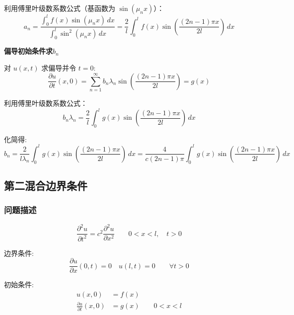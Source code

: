 \documentclass[12pt,a4paper]{article}
\numberwithin{subsection}{section}   %
\numberwithin{subsubsection}{subsection}
\theoremstyle{plain}
\theoremstyle{definition}
\theoremstyle{remark}
\theoremstyle{remark}
\begin{document}
	利用傅里叶级数系数公式（基函数为 $\sin(\mu_n x)$）：
	\begin{equation}
		a_n = \frac{\int_0^l f(x) \sin(\mu_n x) \, dx}{\int_0^l \sin^2(\mu_n x) \, dx} = \frac{2}{l} \int_0^l f(x) \sin\left(\frac{(2n-1)\pi x}{2l}\right) \, dx
	\end{equation}
	
	\noindent
	\textbf{偏导初始条件求$b_n$}
	
	对 $u(x,t)$ 求偏导并令 $t=0$:
	\begin{equation}
		\frac{\partial u}{\partial t}(x, 0) = \sum_{n=1}^{\infty} b_n \lambda_n \sin\left(\frac{(2n-1)\pi x}{2l}\right) = g(x)
	\end{equation}
	
	利用傅里叶级数系数公式：
	\begin{equation}
		b_n \lambda_n = \frac{2}{l} \int_0^l g(x) \sin\left(\frac{(2n-1)\pi x}{2l}\right) \, dx
	\end{equation}
	
	化简得:
	\begin{equation}
		b_n = \frac{2}{l \lambda_n} \int_0^l g(x) \sin\left(\frac{(2n-1)\pi x}{2l}\right) \, dx = \frac{4}{c(2n-1)\pi} \int_0^l g(x) \sin\left(\frac{(2n-1)\pi x}{2l}\right) \, dx
	\end{equation}
	
	\subsection{第二混合边界条件}
	
	\subsubsection{问题描述}
	\begin{equation} \label{eq:wave_equation_mixed2}
		\frac{\partial^2 u}{\partial t^2} = c^2 \frac{\partial^2 u}{\partial x^2} \qquad 0 < x < l, \quad t > 0
	\end{equation}
	
	边界条件:
	\begin{equation} \label{eq:boundary_conditions_mixed2}
		\frac{\partial u}{\partial x}(0, t) = 0 \quad u(l, t) = 0 \qquad \forall t > 0
	\end{equation}
	
	初始条件:
	\begin{equation} \label{eq:initial_conditions_mixed2}
		\begin{aligned}
			u(x, 0) &= f(x) \\
			\frac{\partial u}{\partial t}(x, 0) &= g(x) \qquad 0 < x < l
		\end{aligned}
	\end{equation}
	
\end{document}
